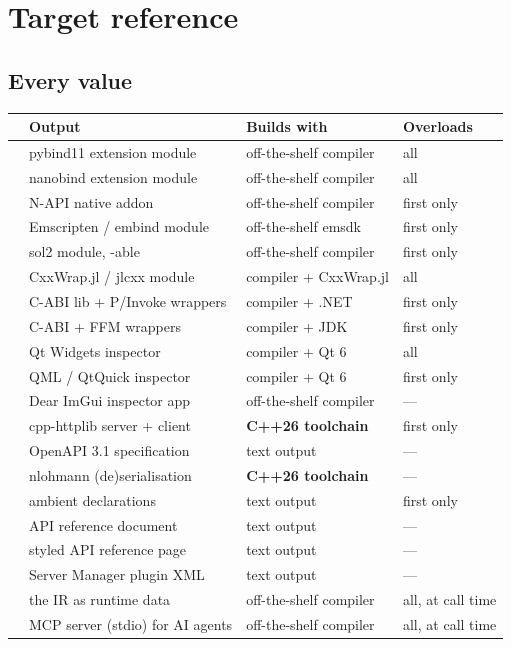 \chapter{Target reference}
\label{app:targets}

\section{Every  value}

\begin{center}
\small
\begin{longtable}{@{}lL{4.2cm}L{3.4cm}L{2.6cm}@{}}
\toprule
\textbf{} & \textbf{Output} & \textbf{Builds with} &
  \textbf{Overloads} \\
\midrule
\endhead
{} & pybind11 extension module & off-the-shelf compiler & all \\
 & nanobind extension module & off-the-shelf compiler & all \\
 & N-API native addon & off-the-shelf compiler & first only \\
 & Emscripten / embind module & off-the-shelf emsdk & first only \\
 & sol2 module, -able & off-the-shelf compiler & first only \\
 & CxxWrap.jl / jlcxx module & compiler + CxxWrap.jl & all \\
 & C-ABI lib + P/Invoke wrappers & compiler + .NET & first only \\
 & C-ABI + FFM wrappers & compiler + JDK & first only \\
 & Qt Widgets inspector & compiler + Qt 6 & all \\
 & QML / QtQuick inspector & compiler + Qt 6 & first only \\
 & Dear ImGui inspector app & off-the-shelf compiler & --- \\
 & cpp-httplib server + client & \textbf{C++26 toolchain} & first only \\
 & OpenAPI 3.1 specification & text output & --- \\
 & nlohmann (de)serialisation & \textbf{C++26 toolchain} & --- \\
 & ambient  declarations & text output & first only \\
 & API reference document & text output & --- \\
 & styled API reference page & text output & --- \\
 & Server Manager plugin XML & text output & --- \\
 & the IR as runtime data & off-the-shelf compiler & all, at
  call time \\
 & MCP server (stdio) for AI agents & off-the-shelf compiler & all, at
  call time \\
\bottomrule
\end{longtable}
\end{center}

